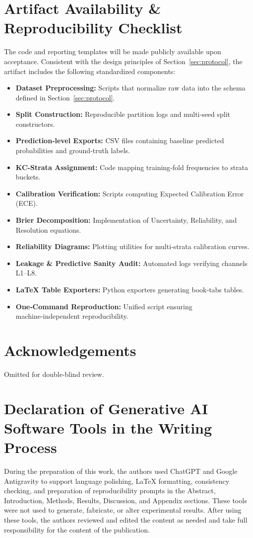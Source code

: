 \documentclass[12pt,a4paper]{jedm}
\begin{document}
\section*{Artifact Availability \& Reproducibility Checklist}
The code and reporting templates will be made publicly available upon acceptance. Consistent with the design principles of Section~\ref{sec:protocol}, the artifact includes the following standardized components:
\begin{itemize}
  \item \textbf{Dataset Preprocessing:} Scripts that normalize raw data into the schema defined in Section~\ref{sec:protocol}.
  \item \textbf{Split Construction:} Reproducible partition logs and multi‑seed split constructors.
  \item \textbf{Prediction‑level Exports:} CSV files containing baseline predicted probabilities and ground‑truth labels.
  \item \textbf{KC‑Strata Assignment:} Code mapping training‑fold frequencies to strata buckets.
  \item \textbf{Calibration Verification:} Scripts computing Expected Calibration Error (ECE).
  \item \textbf{Brier Decomposition:} Implementation of Uncertainty, Reliability, and Resolution equations.
  \item \textbf{Reliability Diagrams:} Plotting utilities for multi‑strata calibration curves.
  \item \textbf{Leakage \& Predictive Sanity Audit:} Automated logs verifying channels L1--L8.
  \item \textbf{LaTeX Table Exporters:} Python exporters generating book‑tabs tables.
  \item \textbf{One‑Command Reproduction:} Unified script ensuring machine‑independent reproducibility.
\end{itemize}

\appendix
\gdef\thesection{Appendix \Alph{section}}


\section*{Acknowledgements}
Omitted for double-blind review.

\section*{Declaration of Generative AI Software Tools in the Writing Process}
During the preparation of this work, the authors used ChatGPT and Google Antigravity to support language polishing, LaTeX formatting, consistency checking, and preparation of reproducibility prompts in the Abstract, Introduction, Methods, Results, Discussion, and Appendix sections. These tools were not used to generate, fabricate, or alter experimental results. After using these tools, the authors reviewed and edited the content as needed and take full responsibility for the content of the publication.

% 
% 
\end{document}
